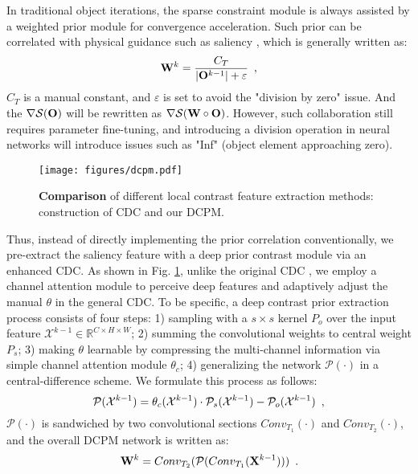 \documentclass[10pt,journal,compsoc]{IEEEtran}
\begin{document}
In traditional object iterations, the sparse constraint module is always assisted by a weighted prior module \cite{dai-2017-ript} for convergence acceleration. Such prior can be correlated with physical guidance such as saliency \cite{kong-2022-logtfnn}, which is generally written as:
\begin{equation}
\setlength{\abovedisplayskip}{2pt}
\setlength{\belowdisplayskip}{2pt}
{\bf{W}}^{k}  =  \frac{C_T}{{\left| {\bf{O}}^{k-1} \right| + \varepsilon }} \enspace,
\label{eq:orgw}
\end{equation}
$C_T$ is a manual constant, and $\varepsilon$ is set to avoid the "division by zero" issue. And the $\nabla\mathcal{S}(\bf{O})$ will be rewritten as $\nabla\mathcal{S}(\bf{W \circ O})$.  However, such collaboration still requires parameter fine-tuning, and introducing a division operation in neural networks will introduce issues such as "Inf" (object element approaching zero). 
\begin{figure}[!t]
\setlength{\abovecaptionskip}{0cm}
\setlength{\belowcaptionskip}{0cm}
    \centering
    \texttt{[image: figures/dcpm.pdf]}
    \caption{\textbf{Comparison} of different local contrast feature extraction methods: construction of CDC \cite{yu-2020-cdc} and our DCPM.}
    \vspace{-0.6cm}
    \label{fig:dcpm}
\end{figure}
Thus, instead of directly implementing the prior correlation conventionally, we pre-extract the saliency feature with a deep prior contrast module via an enhanced CDC. As shown in Fig. \ref{fig:dcpm}, unlike the original CDC \cite{yu-2020-cdc}, we employ a channel attention module to perceive deep features and adaptively adjust the manual $\theta$ in the general CDC. To be specific, a deep contrast prior extraction process consists of four steps: 1) sampling with a $s\times s$ kernel $P_o$ over the input feature $\mathcal{X}^{k-1}\in \mathbb{R}^{C\times H \times W}$; 2) summing the convolutional weights to central weight $P_s$; 3) making $\theta$ learnable by compressing the multi-channel information via simple channel attention \cite{hu-2018-senet} module $\theta_c$; 4) generalizing the network $\mathcal{P}(\cdot)$ in a central-difference scheme. We formulate this process as follows: 
\begin{equation}
\setlength{\abovedisplayskip}{2pt}
\setlength{\belowdisplayskip}{2pt}
\mathcal{P}(\mathcal{X}^{k-1}) = \theta_c(\mathcal{X}^{k-1}) \cdot \mathcal{P}_s(\mathcal{X}^{k-1}) - \mathcal{P}_o( \mathcal{X}^{k-1})
 \enspace,
\label{eq:cdc}
\end{equation}
$\mathcal{P}(\cdot)$ is sandwiched by two convolutional sections $Conv_{T_1}(\cdot)$ and $Conv_{T_2}(\cdot)$, and the overall DCPM network is written as:
\begin{equation}
\setlength{\abovedisplayskip}{2pt}
\setlength{\belowdisplayskip}{2pt}
{\mathbf{W}}^{k} =  Conv_{T_2}(\mathcal{P}(Conv_{T_1}(\mathbf{X}^{k-1})))
 \enspace.
\label{eq:w}
\end{equation}
\end{document}
